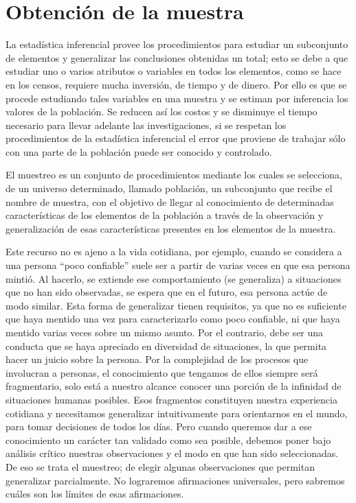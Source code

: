 \documentclass[]{article}
\title{}
\author{}
\date{}
\begin{document}
{
\setcounter{tocdepth}{2}
\tableofcontents
}
\hypertarget{obtencion-de-la-muestra}{%
\section{Obtención de la muestra}\label{obtencion-de-la-muestra}}

La estadística inferencial provee los procedimientos para estudiar un
subconjunto de elementos y generalizar las conclusiones obtenidas un
total; esto se debe a que estudiar uno o varios atributos o variables en
todos los elementos, como se hace en los censos, requiere mucha
inversión, de tiempo y de dinero. Por ello es que se procede estudiando
tales variables en una muestra y se estiman por inferencia los valores
de la población. Se reducen así los costos y se disminuye el tiempo
necesario para llevar adelante las investigaciones, si se respetan los
procedimientos de la estadística inferencial el error que proviene de
trabajar sólo con una parte de la población puede ser conocido y
controlado.

El muestreo es un conjunto de procedimientos mediante los cuales se
selecciona, de un universo determinado, llamado población, un
subconjunto que recibe el nombre de muestra, con el objetivo de llegar
al conocimiento de determinadas características de los elementos de la
población a través de la observación y generalización de esas
características presentes en los elementos de la muestra.

Este recurso no es ajeno a la vida cotidiana, por ejemplo, cuando se
considera a una persona ``poco confiable'' suele ser a partir de varias
veces en que esa persona mintió. Al hacerlo, se extiende ese
comportamiento (se generaliza) a situaciones que no han sido observadas,
se espera que en el futuro, esa persona actúe de modo similar. Esta
forma de generalizar tienen requisitos, ya que no es suficiente que haya
mentido una vez para caracterizarlo como poco confiable, ni que haya
mentido varias veces sobre un mismo asunto. Por el contrario, debe ser
una conducta que se haya apreciado en diversidad de situaciones, la que permita hacer un juicio sobre la persona. Por la complejidad de los procesos que involucran a personas, el conocimiento que tengamos de ellos siempre será fragmentario, solo está a nuestro alcance conocer una porción de la infinidad de situaciones humanas posibles. Esos fragmentos constituyen nuestra experiencia cotidiana y necesitamos generalizar intuitivamente para orientarnos en el mundo, para tomar decisiones de todos los días. Pero cuando queremos dar a ese conocimiento un carácter tan validado como sea posible, debemos poner bajo análisis crítico nuestras observaciones y el modo en que han sido seleccionadas. De eso se trata el muestreo; de elegir algunas observaciones que permitan generalizar parcialmente. No lograremos afirmaciones universales, pero sabremos cuáles son los límites de esas afirmaciones.
\end{document}
